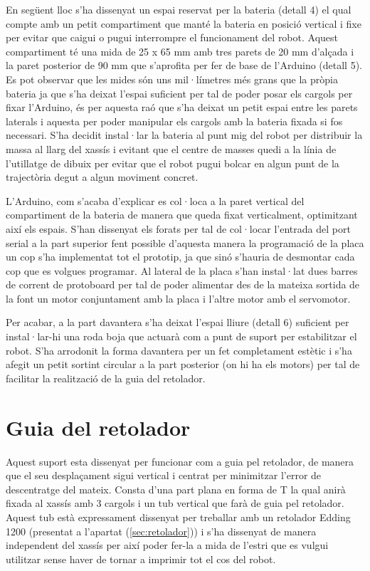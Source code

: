 En següent lloc s’ha dissenyat un espai reservat per la bateria (detall 4) el qual compte amb un petit compartiment que manté la bateria en posició vertical i fixe per evitar que caigui o pugui interrompre el funcionament del robot. Aquest compartiment té una mida de 25 x 65 mm amb tres parets de 20 mm d’alçada i la paret posterior de 90 mm que s’aprofita per fer de base de l’Arduino (detall 5). Es pot observar que les mides són uns mil·límetres més grans que la pròpia bateria ja que s’ha deixat l’espai suficient per tal de poder posar els cargols per fixar l’Arduino, és per aquesta raó que s’ha deixat un petit espai entre les parets laterals i aquesta per poder manipular els cargols amb la bateria fixada si fos necessari. S’ha decidit instal·lar la bateria al punt mig del robot per distribuir la massa al llarg del xassís i evitant que el centre de masses quedi a la línia de l’utillatge de dibuix per evitar que el robot pugui bolcar en algun punt de la trajectòria degut a algun moviment concret.   

L’Arduino, com s’acaba d’explicar es col·loca a la paret vertical del compartiment de la bateria de manera que queda fixat verticalment, optimitzant així els espais. S’han dissenyat els forats per tal de col·locar l’entrada del port serial a la part superior fent possible d’aquesta manera la programació de la placa un cop s’ha implementat tot el prototip, ja que sinó s'hauria de desmontar cada cop que es volgues programar. Al lateral de la placa s’han instal·lat dues barres de corrent de protoboard per tal de poder alimentar des de la mateixa sortida de la font un motor conjuntament amb la placa i l’altre motor amb el servomotor. 

Per acabar, a la part davantera s’ha deixat l’espai lliure (detall 6) suficient per instal·lar-hi una roda boja que actuarà com a punt de suport per estabilitzar el robot. S'ha arrodonit la forma davantera per un fet completament estètic i s'ha afegit un petit sortint circular a la part posterior (on hi ha els motors) per tal de facilitar la realització de la guia del retolador.

\section{Guia del retolador}

Aquest suport esta dissenyat per funcionar com a guia pel retolador, de manera que el seu desplaçament sigui vertical i centrat per minimitzar l’error de descentratge del mateix. Consta d’una part plana en forma de T la qual anirà fixada al xassís amb 3 cargols i un tub vertical que farà de guia pel retolador. Aquest tub està expressament dissenyat per treballar amb un retolador Edding 1200 (presentat a l’apartat (\ref{sec:retolador})) i s’ha dissenyat de manera independent del xassís per així poder fer-la a mida de l’estri que es vulgui utilitzar sense haver de tornar a imprimir tot el cos del robot. 

